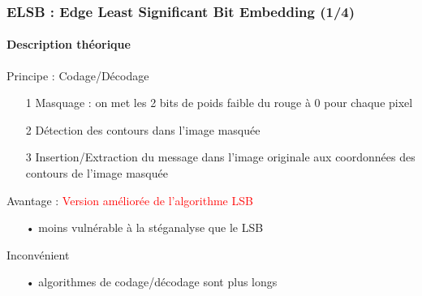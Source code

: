 \documentclass{beamer}
\begin{document}
\begin{frame}
\frametitle{ELSB : Edge Least Significant Bit Embedding (1/4)}
\framesubtitle{Description théorique}

\begin{alertblock}{Principe : Codage/Décodage}
\begin{itemize}
    \item[1] Masquage : on met les 2 bits de poids faible du rouge à $ 0 $ pour chaque pixel
    \item[2] Détection des contours dans l'image masquée
    \item[3] Insertion/Extraction du message dans l'image originale aux coordonnées des contours de l'image masquée 
\end{itemize}
\end{alertblock}

\begin{block}{Avantage : \textcolor{red}{Version améliorée de l'algorithme LSB}}
\begin{itemize}
     \item[•] moins vulnérable à la stéganalyse que le LSB
\end{itemize}
\end{block}

\begin{block}{Inconvénient}
\begin{itemize}
     \item[•] algorithmes de codage/décodage sont plus longs
\end{itemize}
\end{block}
\end{frame}
\end{document}
